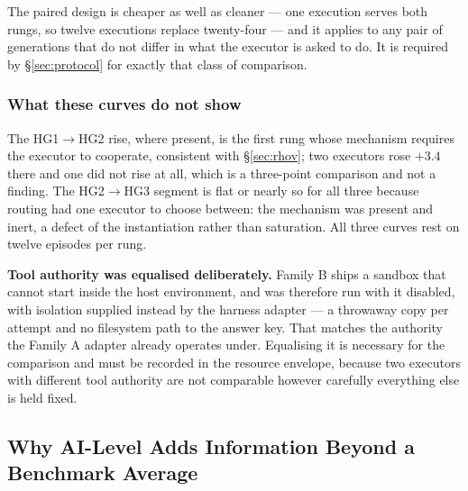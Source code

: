 \documentclass[11pt]{article}
\theoremstyle{definition}
\begin{document}
The paired design is cheaper as well as cleaner --- one execution serves both
rungs, so twelve executions replace twenty-four --- and it applies to any pair of
generations that do not differ in what the executor is asked to do. It is
required by \S\ref{sec:protocol} for exactly that class of comparison.

\subsubsection{What these curves do not show}

The HG1$\to$HG2 rise, where present, is the first rung whose mechanism requires the executor to cooperate, consistent with \S\ref{sec:rhov}; two executors rose $+3.4$ there and one did not rise at all, which is a three-point comparison and not a finding. The HG2$\to$HG3 segment is flat or nearly so for all three because routing had one executor to choose between: the mechanism was present and inert, a defect of the instantiation rather than saturation. All three curves rest on twelve episodes per rung.

\textbf{Tool authority was equalised deliberately.} Family B ships a sandbox that cannot start inside the host environment, and was therefore run with it disabled, with isolation supplied instead by the harness adapter --- a throwaway copy per attempt and no filesystem path to the answer key. That matches the authority the Family A adapter already operates under. Equalising it is necessary for the comparison and must be recorded in the resource envelope, because two executors with different tool authority are not comparable however carefully everything else is held fixed.

\subsection{Why AI-Level Adds Information Beyond a Benchmark Average}
\end{document}
